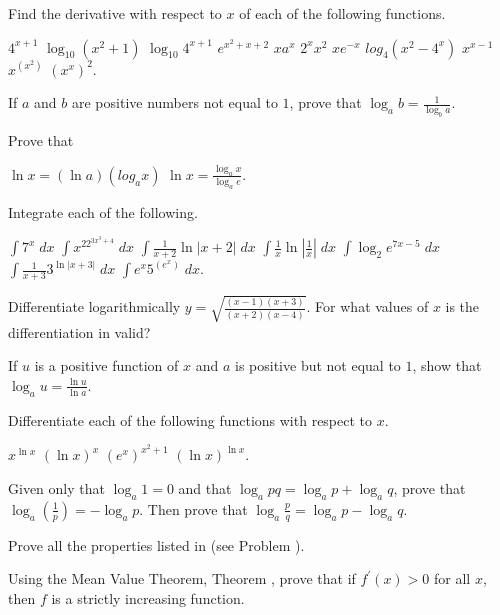 \begin{exercises}

Find the derivative with respect to $x$
of each of the following functions.
\begin{exenum}
\x
$4^{x+1}$
\x
$\log_{10}(x^2+1)$
\x
$\log_{10}4^{x+1}$
\x
$e^{x^2+x+2}$
\x
$xa^x$
\x
$2^xx^2$
\x
$xe^{-x}$
\x
$log_4 (x^2-4^x)$
\x
$x^{x-1}$
\x
$x^{(x^2)}$
\x
$(x^x)^2$.
\end{exenum}

If $a$ and $b$ are positive numbers not equal
to $1$, prove that $\log_ab = \frac1{\log_ba}$.

Prove that
\begin{exenum}
\x
$\ln x = (\ln a)(log_a x)$
\x
$\ln x = \frac{\log_ax}{\log_ae}$.
\end{exenum}

Integrate each of the following.
\begin{exenum}
\x
$\int 7^x \; dx$
\x
$\int x^22^{3x^3+4} \; dx$
\x
$\int \frac1{x+2} \ln |x+2| \; dx$
\x
$\int \frac1x \ln \left|\frac1x\right| \; dx$
\x
$\int \log_2e^{7x-5} \; dx$
\x
$\int \frac1{x+3} 3^{\ln |x+3|} \; dx$
\x
$\int e^x5^{(e^x)} \; dx$.
\end{exenum}

\begin{exenum}
\x
{}
Differentiate logarithmically
$y = \sqrt{\frac{(x-1)(x+3)}{(x+2)(x-4)}}$.
\x
For what values of $x$ is the differentiation
in  valid?
\end{exenum}

If $u$ is a positive function of $x$ and $a$ is
positive but not equal to $1$,
show that
$\log_au = \frac{\ln u}{\ln a}$.

Differentiate each of the following functions
with respect to $x$.
\begin{exenum}
\x
$x^{\ln x}$
\x
$(\ln x)^x$
\x
$(e^x)^{x^2+1}$
\x
$(\ln x)^{\ln x}$.
\end{exenum}

\begin{exenum}
\x
Given only that $\log_a1=0$ and that
$\log_apq = \log_ap +\log_aq$,
prove that
$\log_a \left(\frac1p \right) = -\log_ap$.
\x
Then prove that
$\log_a \frac{p}{q} = \log_ap - \log_aq$.
\end{exenum}

Prove all the properties listed in 
(see Problem ).

Using the Mean Value Theorem, Theorem ,
prove that if $f^\prime(x) > 0$ for all $x$,
then $f$ is a strictly increasing function.


\end{exercises}
